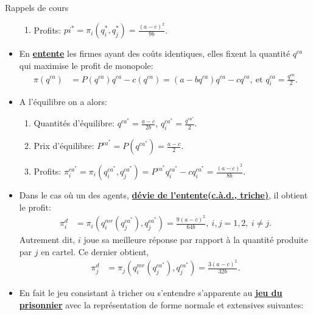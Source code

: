 \begin{frame}[allowframebreaks]{Rappels de cours}
\begin{itemize}
\begin{enumerate}[-]
        \item Profits: $pi^* = \pi_i(q_i^*, q_j^*) = \frac{(a-c)^2}{9b}$.
    \end{enumerate}
    \framebreak
    \item En \textbf{\underline{entente}} les firmes ayant des coûts identiques, elles fixent la quantité $q^{ca}$ qui maximise le profit de monopole:
    \begin{align*}
        \pi(q^{ca}) &= P(q^{ca})q^{ca} - c(q^{ca}) = (a-b q^{ca})q^{ca} - cq^{ca}, \ \text{et $q_i^{ca} = \frac{q^{ca}}{2}$}.
    \end{align*}
    \item A l'équilibre on a alors:
    \begin{enumerate}[-]
        \item Quantités d'équilibre: $q^{ca^*} = \frac{a-c}{2b}$, $q_i^{ca^*} = \frac{q^{ca^*}}{2}$.
        \item Prix d'équilibre: $P^{ca^*} = P(q^{ca^*}) = \frac{a-c}{2}$.
        \item Profits: $\pi_i^{ca^*} = \pi_i(q_i^{ca^*}, q_j^{ca^*}) = P^{ca^*} q_i^{ca^*} - c q_i^{ca^*} = \frac{(a-c)^2}{8b}$.
    \end{enumerate}

    \framebreak
    \item Dans le cas où un des agents, \textbf{\underline{dévie de l'entente(c.à.d., triche)}}, il obtient le profit:
    \begin{align*}
     \pi_i^d &= \pi_i\left(q_i^{mr}(q_j^{ca^*}), q_j^{ca^*}\right) = \frac{9(a-c)^2}{64b}, \ i, j=1, 2, \ i\neq j.
    \end{align*}
    Autrement dit, $i$ joue sa meilleure réponse par rapport à la quantité produite par $j$ en cartel. Ce dernier obtient, 
    \begin{align*}
        \pi_j^d&= \pi_j\left(q_i^{mr}(q_j^{ca^*}), q_j^{ca^*}\right) =\frac{3(a-c)^2}{32b}.
    \end{align*}

\framebreak

\item En fait le jeu consistant à tricher ou s'entendre s'apparente au
 \textbf{\underline{jeu du prisonnier}} avec la représentation de forme normale et extensives suivantes:




\end{itemize}
\end{frame}
